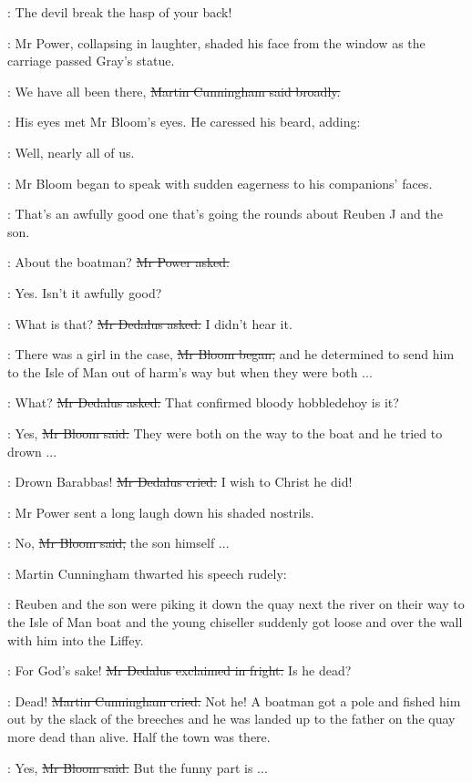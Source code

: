 \simon:
The devil break the hasp of your back!

:
Mr Power, collapsing in laughter,
shaded his face from the window as the carriage passed Gray's statue.

\cunningham:
We have all been there,
\sout{Martin Cunningham said broadly.}

:
His eyes met Mr Bloom's eyes.
He caressed his beard, adding:

\cunningham:
Well, nearly all of us.

:
Mr Bloom began to speak with sudden eagerness to his companions' faces.

\Bloom:
That's an awfully good one that's going the rounds
about Reuben J and the son.

\power:
About the boatman?
\sout{Mr Power asked.}

\Bloom:
Yes.
Isn't it awfully good?

\simon:
What is that?
\sout{Mr Dedalus asked.}
I didn't hear it.

\Bloom:
There was a girl in the case,
\sout{Mr Bloom began,}
and he determined to send him
to the Isle of Man out of harm's way
but when they were both ...

\simon:
What?
\sout{Mr Dedalus asked.}
That confirmed bloody hobbledehoy is it?

\Bloom:
Yes,
\sout{Mr Bloom said.}
They were both on the way to the boat and he tried to drown ...

\simon:
Drown Barabbas!
\sout{Mr Dedalus cried.}
I wish to Christ he did!

:
Mr Power sent a long laugh down his shaded nostrils.

\Bloom:
No,
\sout{Mr Bloom said,}
the son himself ...

:
Martin Cunningham thwarted his speech rudely:

\cunningham:
Reuben and the son were piking it down the quay next the river
on their way to the Isle of Man boat
and the young chiseller suddenly got loose
and over the wall with him into the Liffey.

\simon:
For God's sake!
\sout{Mr Dedalus exclaimed in fright.}
Is he dead?

\cunningham:
Dead!
\sout{Martin Cunningham cried.}
Not he!
A boatman got a pole and fished him out by the slack of the breeches
and he was landed up to the father on the quay
more dead than alive.
Half the town was there.

\Bloom:
Yes,
\sout{Mr Bloom said.}
But the funny part is ...

